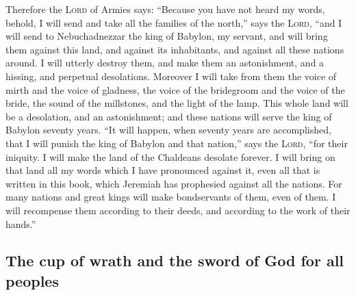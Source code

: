  Therefore the \textsc{Lord} of Armies says: ``Because you
have not heard my words,  behold, I will send and take all
the families of the north,'' says the \textsc{Lord}, ``and I will send
to Nebuchadnezzar the king of Babylon, my servant, and will bring them
against this land, and against its inhabitants, and against all these
nations around. I will utterly destroy them, and make them an
astonishment, and a hissing, and perpetual desolations. 
Moreover I will take from them the voice of mirth and the voice of
gladness, the voice of the bridegroom and the voice of the bride, the
sound of the millstones, and the light of the lamp.  This
whole land will be a desolation, and an astonishment; and these nations
will serve the king of Babylon seventy years.  ``It will
happen, when seventy years are accomplished, that I will punish the king
of Babylon and that nation,'' says the \textsc{Lord}, ``for their
iniquity. I will make the land of the Chaldeans desolate forever.
 I will bring on that land all my words which I have
pronounced against it, even all that is written in this book, which
Jeremiah has prophesied against all the nations.  For
many nations and great kings will make bondservants of them, even of
them. I will recompense them according to their deeds, and according to
the work of their hands.''

\hypertarget{the-cup-of-wrath-and-the-sword-of-god-for-all-peoples}{%
\subsection{The cup of wrath and the sword of God for all
peoples}\label{the-cup-of-wrath-and-the-sword-of-god-for-all-peoples}}

